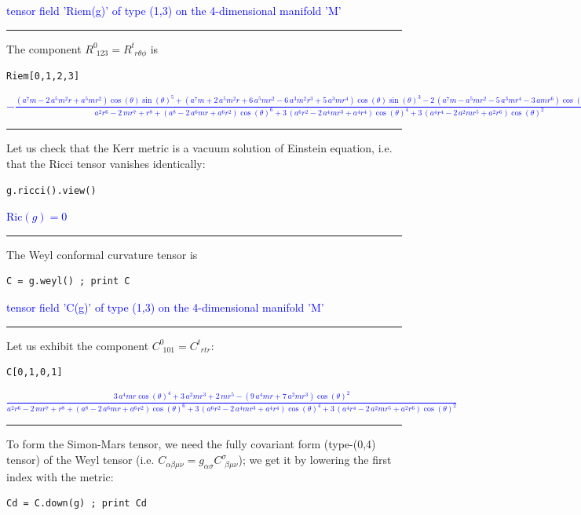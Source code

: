 \documentclass[a4paper]{jpconf}
\newcommand{\soutput}[1]{\textcolor{blue}{#1}\\[-0.8ex]\rule{\textwidth}{0.4pt}}
\begin{document}
\soutput{tensor field 'Riem(g)' of type (1,3) on the 4-dimensional manifold 'M'}
The component $R^0_{\ \, 123} = R^t_{\ \, r\theta\phi}$ is 
\begin{verbatim}
Riem[0,1,2,3]
\end{verbatim}
\soutput{\tiny $-\frac{{\left(a^{7} m - 2 \, a^{5} m^{2} r + a^{5} m r^{2}\right)}
\cos\left(\theta\right) \sin\left(\theta\right)^{5} + {\left(a^{7} m + 2
\, a^{5} m^{2} r + 6 \, a^{5} m r^{2} - 6 \, a^{3} m^{2} r^{3} + 5 \,
a^{3} m r^{4}\right)} \cos\left(\theta\right)
\sin\left(\theta\right)^{3} - 2 \, {\left(a^{7} m - a^{5} m r^{2} - 5 \,
a^{3} m r^{4} - 3 \, a m r^{6}\right)} \cos\left(\theta\right)
\sin\left(\theta\right)}{a^{2} r^{6} - 2 \, m r^{7} + r^{8} +
{\left(a^{8} - 2 \, a^{6} m r + a^{6} r^{2}\right)}
\cos\left(\theta\right)^{6} + 3 \, {\left(a^{6} r^{2} - 2 \, a^{4} m
r^{3} + a^{4} r^{4}\right)} \cos\left(\theta\right)^{4} + 3 \,
{\left(a^{4} r^{4} - 2 \, a^{2} m r^{5} + a^{2} r^{6}\right)}
\cos\left(\theta\right)^{2}}$}
Let us check that the Kerr metric is 
a vacuum solution of Einstein equation, i.e. that the Ricci tensor
vanishes identically:
\begin{verbatim}
g.ricci().view()
\end{verbatim}
\soutput{$\mathrm{Ric}(g) = 0$}
The Weyl conformal curvature tensor is
\begin{verbatim}
C = g.weyl() ; print C
\end{verbatim}
\soutput{tensor field 'C(g)' of type (1,3) on the 4-dimensional manifold 'M'}
Let us exhibit the component $C^0_{\ \, 101}=C^t_{\ \, rtr}$:
\begin{verbatim}
C[0,1,0,1]
\end{verbatim}
\soutput{$\frac{3 \, a^{4} m r \cos\left(\theta\right)^{4} + 3 \, a^{2} m r^{3} +
2 \, m r^{5} - {\left(9 \, a^{4} m r + 7 \, a^{2} m r^{3}\right)}
\cos\left(\theta\right)^{2}}{a^{2} r^{6} - 2 \, m r^{7} + r^{8} +
{\left(a^{8} - 2 \, a^{6} m r + a^{6} r^{2}\right)}
\cos\left(\theta\right)^{6} + 3 \, {\left(a^{6} r^{2} - 2 \, a^{4} m
r^{3} + a^{4} r^{4}\right)} \cos\left(\theta\right)^{4} + 3 \,
{\left(a^{4} r^{4} - 2 \, a^{2} m r^{5} + a^{2} r^{6}\right)}
\cos\left(\theta\right)^{2}}$}
To form the Simon-Mars tensor, we need the fully covariant form (type-(0,4)
tensor) of the Weyl tensor (i.e. $C_{\alpha\beta\mu\nu} = g_{\alpha\sigma} C^\sigma_{\ \, \beta\mu\nu}$); we get it by lowering the first index with the metric:
\begin{verbatim}
Cd = C.down(g) ; print Cd
\end{verbatim}
\end{document}
